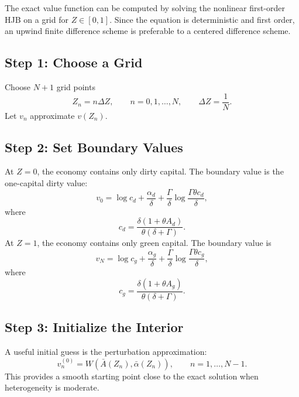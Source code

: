 \documentclass[11pt]{article}
\newcommand{\Abar}{\bar A}
\newcommand{\alphabar}{\bar\alpha}
\begin{document}
The exact value function can be computed by solving the nonlinear first-order HJB on a grid for $Z\in[0,1]$. Since the equation is deterministic and first order, an upwind finite difference scheme is preferable to a centered difference scheme.

\subsection{Step 1: Choose a Grid}

Choose $N+1$ grid points
\begin{equation}
    Z_n=n\Delta Z,
    \qquad
    n=0,1,\ldots,N,
    \qquad
    \Delta Z=\frac{1}{N}.
\end{equation}
Let $v_n$ approximate $v(Z_n)$.

\subsection{Step 2: Set Boundary Values}

At $Z=0$, the economy contains only dirty capital. The boundary value is the one-capital dirty value:
\begin{equation}
    v_0
    =
    \log c_d
    +\frac{\alpha_d}{\delta}
    +\frac{\Gamma}{\delta}\log\frac{\Gamma\theta c_d}{\delta},
\end{equation}
where
\begin{equation}
    c_d=\frac{\delta(1+\theta A_d)}{\theta(\delta+\Gamma)}.
\end{equation}
At $Z=1$, the economy contains only green capital. The boundary value is
\begin{equation}
    v_N
    =
    \log c_g
    +\frac{\alpha_g}{\delta}
    +\frac{\Gamma}{\delta}\log\frac{\Gamma\theta c_g}{\delta},
\end{equation}
where
\begin{equation}
    c_g=\frac{\delta(1+\theta A_g)}{\theta(\delta+\Gamma)}.
\end{equation}

\subsection{Step 3: Initialize the Interior}

A useful initial guess is the perturbation approximation:
\begin{equation}
    v_n^{(0)}=W\left(\Abar(Z_n),\alphabar(Z_n)\right),
    \qquad n=1,\ldots,N-1.
\end{equation}
This provides a smooth starting point close to the exact solution when heterogeneity is moderate.
\end{document}
